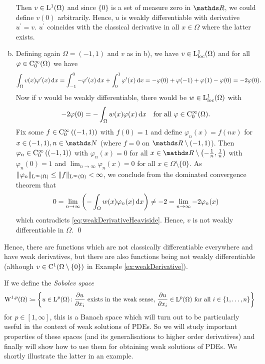 \begin{ex}
\begin{enumerate}[a)]
      Then $v \in \mathrm{L}^1(\Omega)$ and since $\{0\}$ is a set of measure zero in $\R$, we could define $v(0)$ arbitrarily.
      Hence, $u$ is weakly differentiable with derivative $u^\prime = v$.
      $u^\prime$ coincides with the classical derivative in all $x \in \Omega$ where the latter exists.
    \item Defining again $\Omega = (-1,1)$ and $v$ as in b), we have $v \in \mathrm{L}_{\operatorname{loc}}^1(\Omega)$ and for all $\varphi \in \mathrm{C}_0^\infty(\Omega)$ we have
      \begin{align*}
      \int_\Omega v(x) \varphi^\prime(x) \, {\operatorname{d}\!{x}} 
      &= \int_{-1}^0 - \varphi^\prime(x) \, {\operatorname{d}\!{x}} + \int_0^1 \varphi^\prime(x) \, {\operatorname{d}\!{x}} 
      = - \varphi(0) + \varphi(-1) + \varphi(1) - \varphi(0) = -2\varphi(0).
      \end{align*}
      Now if $v$ would be weakly differentiable, there would be $w \in \mathrm{L}_{\operatorname{loc}}^1(\Omega)$ with
      \begin{equation}
        \label{eq:weakDerivativeHeaviside}
        -2\varphi(0) = -\int_\Omega w(x) \varphi(x) \, {\operatorname{d}\!{x}} \quad\text{for all } \varphi \in \mathrm{C}_0^\infty(\Omega).
      \end{equation}
      Fix some $f \in \mathrm{C}_0^\infty\left((-1,1)\right)$ with $f(0) = 1$ and define $\varphi_n(x) = f(nx)$ for $x \in (-1,1), n \in \N$ (where $f = 0$ on $\R \setminus(-1,1)$).
      Then $\varphi_n \in \mathrm{C}_0^\infty\left( (-1,1)\right)$ with $\varphi_n(x) = 0$ for all $x \in \R \setminus\left(-\frac{1}{n}, \frac{1}{n} \right)$ with $\varphi_n(0) = 1$ and $\lim_{n \to \infty} \varphi_n(x) = 0$ for all $x \in \Omega \setminus \{0\}$. As $\|\varphi_n\|_{\mathrm{L}^\infty(\Omega)} \leq \|f\|_{\mathrm{L}^\infty(\Omega)} < \infty$, we conclude from the dominated convergence theorem that
      $$
      0 = \lim_{n \to \infty} \left( -\int_\Omega w(x) \varphi_n(x) \, {\operatorname{d}\!{x}} \right) \neq -2 = \lim_{n \to \infty} - 2\varphi_n(x)
      $$
      which contradicts \eqref{eq:weakDerivativeHeaviside}.
      Hence, $v$ is not weakly differentiable in $\Omega$.
  \qed
  \end{enumerate}
\end{ex}

Hence, there are functions which are not classically differentiable everywhere and have weak derivatives, but there are also functions being not weakly differentiable (although $v \in  \mathrm{C}^1(\Omega\setminus\{0\})$ in Example \ref{ex:weakDerivative}).

If we define the \emph{Sobolev space}
$$
\mathrm{W}^{1,p}(\Omega) \coloneqq \left\{u \in \mathrm{L}^p(\Omega) \colon \frac{\partial u}{\partial x_i} \text{ exists in the weak sense, } \frac{\partial u}{\partial x_i} \in \mathrm{L}^p(\Omega) \text{ for all } i \in \{1,\dots,n\}\right\}
$$
for $p \in [1,\infty]$, this is a Banach space which will turn out to be particularly useful in the context of weak solutions of PDEs. 
So we will study important properties of these spaces (and its generalisations to higher order derivatives) and finally will show how to use them for obtaining weak solutions of PDEs.
We shortly illustrate the latter in an example.

